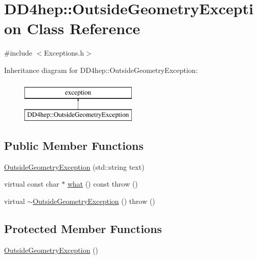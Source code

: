 \hypertarget{class_d_d4hep_1_1_outside_geometry_exception}{}\section{D\+D4hep\+:\+:Outside\+Geometry\+Exception Class Reference}
\label{class_d_d4hep_1_1_outside_geometry_exception}


{\ttfamily \#include $<$Exceptions.\+h$>$}

Inheritance diagram for D\+D4hep\+:\+:Outside\+Geometry\+Exception\+:\begin{figure}[H]
\begin{center}
\leavevmode
\includegraphics[height=2.000000cm]{class_d_d4hep_1_1_outside_geometry_exception}
\end{center}
\end{figure}
\subsection*{Public Member Functions}
\begin{DoxyCompactItemize}
\item 
\hyperlink{class_d_d4hep_1_1_outside_geometry_exception_a11e9856846c7f8f2acb85f2774558422}{Outside\+Geometry\+Exception} (std\+::string text)
\item 
virtual const char $\ast$ \hyperlink{class_d_d4hep_1_1_outside_geometry_exception_a8b4b4c2ecb8f24f0ffb90dfdb841eb96}{what} () const  throw ()
\item 
virtual \hyperlink{class_d_d4hep_1_1_outside_geometry_exception_a7e9be9d6e116f089183a65ab413daa56}{$\sim$\+Outside\+Geometry\+Exception} ()  throw ()
\end{DoxyCompactItemize}
\subsection*{Protected Member Functions}
\begin{DoxyCompactItemize}
\item 
\hyperlink{class_d_d4hep_1_1_outside_geometry_exception_afcb996b89fe54d62d9c20068cb342812}{Outside\+Geometry\+Exception} ()
\end{DoxyCompactItemize}

